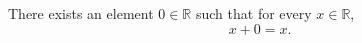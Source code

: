 There exists an element $0 \in \mathbb{R}$ such that for every $x \in \mathbb{R}$,
\begin{equation*}
x + 0 = x.
\end{equation*}
